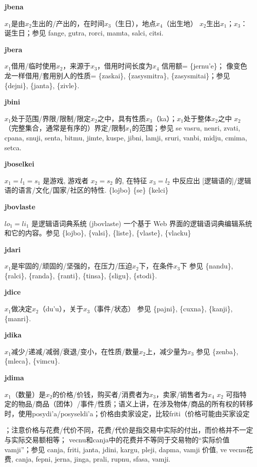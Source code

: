 \documentclass[notitlepage,twocolumn,a4paper,10pt]{book}
\begin{document}
{{\sffamily\bfseries jbena}\enspace {\ttfamily\bfseries[    jbe]}  $x_1$是由$x_2$生出的\slash{}产出的，在时间$x_3$（生日），地点$x_4$（出生地） \textemdash{} $x_2$生出$x_1$；$x_3$：诞生日；参见 {fange}, {gutra}, {rorci}, {mamta}, {salci}, {citsi}.

{\sffamily\bfseries jbera}\enspace {\ttfamily\bfseries[jer]}  $x_1$借用\slash{}临时使用$x_2$，来源于$x_3$，借用时间长度为$x_4$ \textemdash{} 信用额= \{jernu'e\}； 像变色龙一样借用\slash{}套用别人的性质= \{zaskai\}, \{zasysmitra\}, \{zasysmitai\}；参见 \{dejni\}, \{janta\}, \{zivle\}.

{\sffamily\bfseries jbini}\enspace {\ttfamily\bfseries[bin     bi'i]}  $x_1$处于范围\slash{}界限\slash{}限制\slash{}限定$x_2$之中，具有性质$x_3$（ka）；$x_1$处于整体$x_2$之中 \textemdash{} $x_2$（完整集合，通常是有序的）界定\slash{}限制$x_1$的范围；参见 se {vasru}, {nenri}, {zvati}, {cpana}, {snuji}, {senta}, {bitmu}, {jimte}, {kuspe}, {jibni}, {lamji}, {sruri}, {vanbi}, {midju}, {cmima}, {setca}.

{\sffamily\bfseries jboselkei} $x_1=l_1=s_1$ 是游戏, 游戏者 $x_2=s_2$ 的, 在特征 $x_3=l_2$ 中反应出 [逻辑语的]\slash{}逻辑语的语言\slash{}文化\slash{}国家\slash{}社区的特性. \textemdash{} \{lojbo\} \{se\} \{kelci\}

{\sffamily\bfseries jbovlaste} $lo_1=li_1$ 是逻辑语词典系统 (jbovlaste) \textemdash{} 一个基于 Web 界面的逻辑语词典编辑系统和它的内容。参见 \{lojbo\}, \{valsi\}, \{liste\}, \{vlaste\}, \{vlacku\}

{\sffamily\bfseries jdari}\enspace {\ttfamily\bfseries[jar]}  $x_1$是牢固的\slash{}顽固的\slash{}坚强的，在压力\slash{}压迫$x_2$下，在条件$x_3$下 \textemdash{} 参见 \{nandu\}, \{ralci\}, \{randa\}, \{ranti\}, \{tinsa\}, \{sligu\}, \{stodi\}.

{\sffamily\bfseries jdice}\enspace {\ttfamily\bfseries[    jdi]}  $x_1$做决定$x_2$（du'u），关于$x_3$（事件\slash{}状态） \textemdash{} 参见 \{pajni\}, \{cuxna\}, \{kanji\}, \{manri\}.

{\sffamily\bfseries jdika} $x_1$减少\slash{}递减\slash{}减弱\slash{}衰退\slash{}变小，在性质\slash{}数量$x_2$上，减少量为$x_3$ \textemdash{} 参见 \{zenba\}, \{mleca\}, \{vimcu\}.

{\sffamily\bfseries jdima}\enspace {\ttfamily\bfseries[        di'a]}  $x_1$（数量）是$x_2$的价格\slash{}价钱，购买者\slash{}消费者为$x_3$，卖家\slash{}销售者为$x_4$ \textemdash{} $x_2$ 可指特定的物品\slash{}商品（团体）\slash{}事件\slash{}性质；语义上讲，在涉及物体\slash{}商品的所有权的转移时，使用{posydi'a}\slash{}{posyseldi'a}；价格由卖家设定，比较{friti}（价格可能由买家设定}；注意价格与花费\slash{}代价不同，花费\slash{}代价是指交易中实际的付出，而价格并不一定与实际交易额相等； {vecnu}和{canja}中的花费并不等同于交易物的“实际价值{vamji}”；参见 {canja}, {friti}, {janta}, {jdini}, {kargu}, {pleji}, {dapma}, {vamji} 价值, ve {vecnu}花费, {canja}, {fepni}, {jerna}, {jinga}, {prali}, {rupnu}, {sfasa}, {vamji}.
\end{document}
